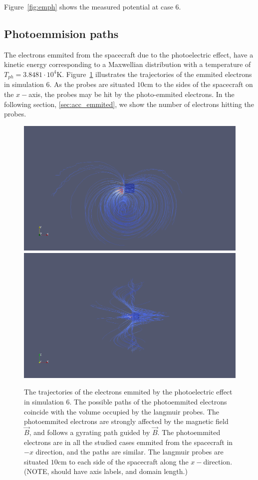 	Figure~\ref{fig:emph} shows the measured potential at case \(6\).


\subsection{Photoemmision paths}

	The electrons emmited from the spacecraft due to the photoelectric effect, have a kinetic
	energy corresponding to a Maxwellian distribution with a temperature of \(T_{ph} =  3.8481\cdot 10^{4} \text{K}\).
	Figure~\ref{fig:trajectories} illustrates the trajectories of the emmited electrons in simulation \(6\).
	As the probes are situated \(10 \text{cm}\) to the sides of the spacecraft on the \(x-\)axis, the probes
	may be hit by the photo-emmited electrons. In the following section, \ref{sec:acc_emmited}, we show the number of electrons hitting
	the probes.


	\begin{figure}
		\includegraphics[width = 0.49 \textwidth]{images/case6_jph_paths}
		\includegraphics[width = 0.49 \textwidth]{images/case6_jph_paths_2}
		\caption{The trajectories of the electrons emmited by the photoelectric effect in simulation \(6\). The possible
		paths of the photoemmited electrons coincide with the volume occupied by the langmuir probes. The photoemmited electrons are strongly affected by the magnetic
		field \(\vec{B}\), and follows a gyrating path guided by \(\vec{B}\). The photoemmited electrons are in all the studied cases
		emmited from the spacecraft in \(-x\) direction, and the paths are similar. The langmuir probes are situated \(10 \text{cm}\) to each side
		of the spacecraft along the \(x-\)direction. (NOTE, should have axis labels, and domain length.)}
		\label{fig:trajectories}
	\end{figure}

